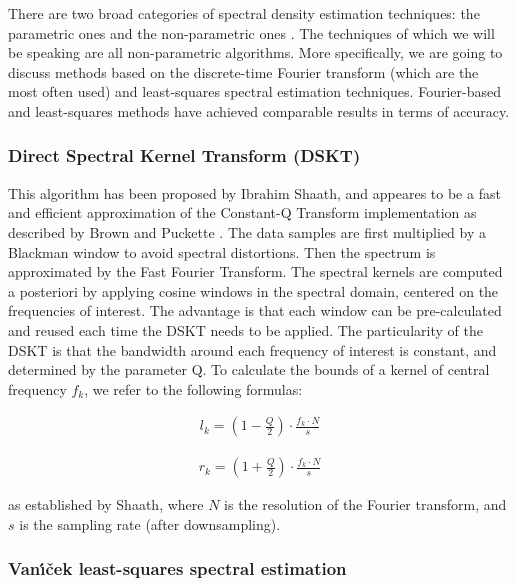 \documentclass[letterpaper]{article}
\begin{document}
There are two broad categories of spectral density estimation techniques: the parametric ones and the non-parametric ones \citep{MHH}. The techniques
of which we will be speaking are all non-parametric algorithms. More specifically, we are going to discuss methods based on the discrete-time Fourier transform (which are the most often used) and least-squares spectral estimation techniques. Fourier-based and least-squares methods have achieved comparable results in terms of accuracy.

\subsubsection{Direct Spectral Kernel Transform (DSKT)}

This algorithm has been proposed by Ibrahim Sha\textquotesingle ath, and appeares to be a fast and efficient approximation of the Constant-Q Transform implementation as described by Brown and Puckette \citep{CQT}.
The data samples are first multiplied by a Blackman window to avoid spectral distortions. Then the spectrum is approximated by the Fast Fourier Transform.
The spectral kernels are computed a posteriori by applying cosine windows in the spectral domain, centered on the frequencies of interest. The advantage is that each window can be pre-calculated and reused each time the DSKT needs to be applied. The particularity of the DSKT is that the bandwidth around each frequency of interest is constant, and determined by the parameter Q. To calculate the bounds of a kernel of central frequency $ f_k $, we refer to the following formulas:

\begin{align}
l_k  = (1 - \frac{Q}{2}) \cdot \frac{f_k \cdot N}{s}
\end{align}

\begin{align}
r_k  = (1 + \frac{Q}{2}) \cdot \frac{f_k \cdot N}{s}
\end{align}

\noindent as established by Sha\textquotesingle ath, where $N$ is the resolution of the Fourier transform, and $s$ is the sampling rate (after downsampling).

\subsubsection{Van\'{\i}\v{c}ek least-squares spectral estimation}
\end{document}
